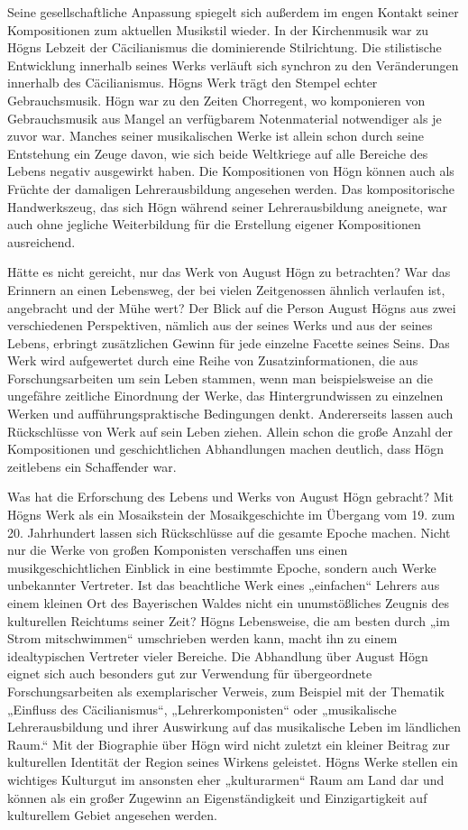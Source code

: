 \documentclass[a4paper]{article}
\begin{document}
Seine gesellschaftliche Anpassung spiegelt sich außerdem im engen
Kontakt seiner Kompositionen zum aktuellen Musikstil wieder. In der
Kirchenmusik war zu Högns Lebzeit der Cäcilianismus die dominierende
Stilrichtung. Die stilistische Entwicklung innerhalb seines Werks
verläuft sich synchron zu den Veränderungen innerhalb des
Cäcilianismus. Högns Werk trägt den Stempel echter Gebrauchsmusik. Högn
war zu den Zeiten Chorregent, wo komponieren von Gebrauchsmusik aus
Mangel an verfügbarem Notenmaterial notwendiger als je zuvor war.
Manches seiner musikalischen Werke ist allein schon durch seine
Entstehung ein Zeuge davon, wie sich beide Weltkriege auf alle Bereiche
des Lebens negativ ausgewirkt haben. Die Kompositionen von Högn können
auch als Früchte der damaligen Lehrerausbildung angesehen werden. Das
kompositorische Handwerkszeug, das sich Högn während seiner
Lehrerausbildung aneignete, war auch ohne jegliche Weiterbildung für
die Erstellung eigener Kompositionen ausreichend.

Hätte es nicht gereicht, nur das Werk von August Högn zu betrachten? War
das Erinnern an einen Lebensweg, der bei vielen Zeitgenossen ähnlich
verlaufen ist, angebracht und der Mühe wert? Der Blick auf die Person
August Högns aus zwei verschiedenen Perspektiven, nämlich aus der
seines Werks und aus der seines Lebens, erbringt zusätzlichen Gewinn
für jede einzelne Facette seines Seins. Das Werk wird aufgewertet durch
eine Reihe von Zusatzinformationen, die aus Forschungsarbeiten um sein
Leben stammen, wenn man beispielsweise an die ungefähre zeitliche
Einordnung der Werke, das Hintergrundwissen zu einzelnen Werken und
aufführungspraktische Bedingungen denkt. Andererseits lassen auch
Rückschlüsse von Werk auf sein Leben ziehen. Allein schon die große
Anzahl der Kompositionen und geschichtlichen Abhandlungen machen
deutlich, dass Högn zeitlebens ein Schaffender war.

Was hat die Erforschung des Lebens und Werks von August Högn gebracht?
Mit Högns Werk als ein Mosaikstein der Mosaikgeschichte im Übergang vom
19. zum 20. Jahrhundert lassen sich Rückschlüsse auf die gesamte Epoche
machen. Nicht nur die Werke von großen Komponisten verschaffen uns
einen musikgeschichtlichen Einblick in eine bestimmte Epoche, sondern
auch Werke unbekannter Vertreter. Ist das beachtliche Werk eines
„einfachen“ Lehrers aus einem kleinen Ort des Bayerischen Waldes nicht
ein unumstößliches Zeugnis des kulturellen Reichtums seiner Zeit? Högns
Lebensweise, die am besten durch „im Strom mitschwimmen“ umschrieben
werden kann, macht ihn zu einem idealtypischen Vertreter vieler
Bereiche. Die Abhandlung über August Högn eignet sich auch besonders
gut zur Verwendung für übergeordnete Forschungsarbeiten als
exemplarischer Verweis, zum Beispiel mit der Thematik „Einfluss des
Cäcilianismus“, „Lehrerkomponisten“ oder „musikalische Lehrerausbildung
und ihrer Auswirkung auf das musikalische Leben im ländlichen Raum.“
Mit der Biographie über Högn wird nicht zuletzt ein kleiner Beitrag zur
kulturellen Identität der Region seines Wirkens geleistet. Högns Werke
stellen ein wichtiges Kulturgut im ansonsten eher „kulturarmen“ Raum am
Land dar und können als ein großer Zugewinn an Eigenständigkeit und
Einzigartigkeit auf kulturellem Gebiet angesehen werden.
\end{document}
